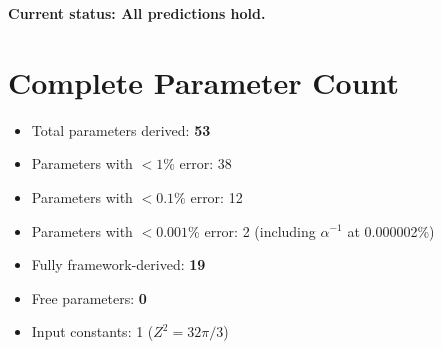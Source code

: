 \documentclass[11pt,a4paper]{article}
\theoremstyle{plain}
\theoremstyle{definition}
\theoremstyle{remark}
\begin{document}
\textbf{Current status: All predictions hold.}

\section{Complete Parameter Count}

\begin{itemize}
  \item Total parameters derived: \textbf{53}
  \item Parameters with $<1\%$ error: 38
  \item Parameters with $<0.1\%$ error: 12
  \item Parameters with $<0.001\%$ error: 2 (including $\alpha^{-1}$ at 0.000002\%)
  \item Fully framework-derived: \textbf{19}
  \item Free parameters: \textbf{0}
  \item Input constants: 1 ($Z^2 = 32\pi/3$)
\end{itemize}
\end{document}
